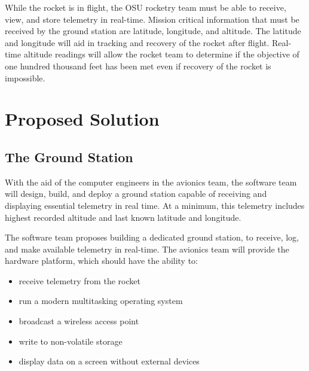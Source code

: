 \documentclass[10pt,journal,draftclsnofoot,onecolumn]{IEEEtran}
\begin{document}
	While the rocket is in flight, the \ac{OSU} rocketry team
	must be able to receive, view, and store telemetry in real-time.
	Mission critical information that must be received by the ground
	station are latitude, longitude, and altitude. The latitude
	and longitude will aid in tracking and recovery of the rocket
	after flight. Real-time altitude readings will allow the rocket
	team to determine if the objective of one hundred thousand feet
	has been met even if recovery of the rocket is impossible.
	
	
	\section{Proposed Solution}

	\subsection{The Ground Station}

	With the aid of the computer engineers in the avionics team,
	the software team will design, build, and deploy a ground station
	capable of receiving and displaying essential telemetry in real time.
	At a minimum, this telemetry includes highest recorded altitude and
	last known latitude and longitude.

	The software team proposes building a dedicated ground station,
	to receive, log, and make available telemetry in real-time.
	The avionics team will provide the hardware platform, which should
	have the ability to:

	\begin{itemize}
	\item receive telemetry from the rocket
	\item run a modern multitasking operating system
	\item broadcast a wireless access point
	\item write to non-volatile storage
	\item display data on a screen without external devices
	\end{itemize}
\end{document}

